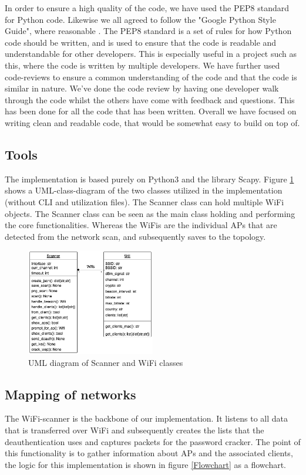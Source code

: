 In order to ensure a high quality of the code, we have used the PEP8 standard for Python code. Likewise we all agreed to follow the "Google Python Style Guide", where reasonable \cite{PEP}. The PEP8 standard is a set of rules for how Python code should be written, and is used to ensure that the code is readable and understandable for other developers. This is especially useful in a project such as this, where the code is written by multiple developers.
We have further used code-reviews to ensure a common understanding of the code and that the code is similar in nature. We've done the code review by having one developer walk through the code whilst the others have come with feedback and questions. This has been done for all the code that has been written. 
Overall we have focused on writing clean and readable code, that would be somewhat easy to build on top of.



\subsection{Tools}
The implementation is based purely on Python3 and the library Scapy. Figure \ref{UML_diagram} shows a UML-class-diagram of the two classes utilized in the implementation (without CLI and utilization files). The Scanner class can hold multiple WiFi objects. The Scanner class can be seen as the main class holding and performing the core functionalities. Whereas the WiFis are the individual APs that are detected from the network scan, and subsequently saves to the topology.
\begin{figure}[!htbp]
    \centering
    \includegraphics[width=0.5\textwidth]{Latex-Files/Billeder/Flowcharts/classes.png}
    \caption{UML diagram of Scanner and WiFi classes}
    \label{UML_diagram}
\end{figure}
\subsection{Mapping of networks}
The WiFi-scanner is the backbone of our implementation. It listens to all data that is transferred over WiFi and subsequently creates the lists that the deauthentication uses and captures packets for the password cracker. The point of this functionality is to gather information about APs and the associated clients, the logic for this implementation is shown in figure \ref{Flowchart} as a flowchart.

